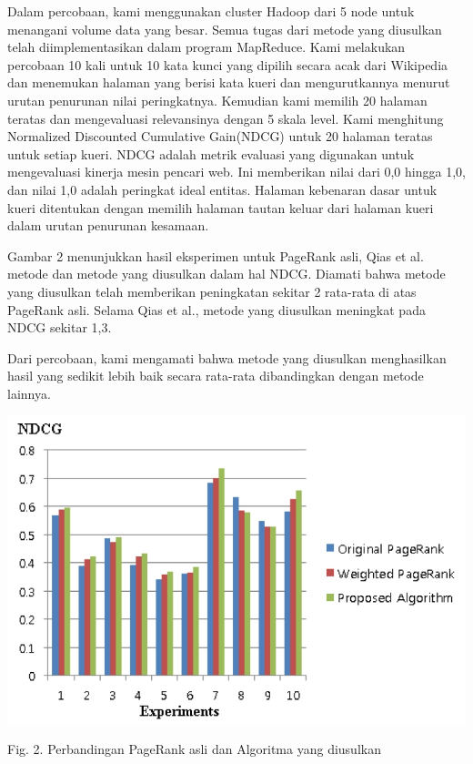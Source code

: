 \documentclass[conference]{IEEEtran}
\begin{document}
Dalam percobaan, kami menggunakan cluster Hadoop dari 5 node untuk menangani volume data yang besar. Semua tugas dari metode yang diusulkan telah diimplementasikan dalam program MapReduce.
Kami melakukan percobaan 10 kali untuk 10 kata kunci yang dipilih secara acak dari Wikipedia dan menemukan halaman yang berisi kata kueri dan mengurutkannya menurut urutan penurunan nilai peringkatnya. Kemudian kami memilih 20 halaman teratas dan mengevaluasi relevansinya dengan 5 skala level.
Kami menghitung Normalized Discounted Cumulative Gain(NDCG)\cite{resnik1999semantic} untuk 20 halaman teratas untuk setiap kueri. NDCG adalah metrik evaluasi yang digunakan untuk mengevaluasi kinerja mesin pencari web. Ini memberikan nilai dari 0,0 hingga 1,0, dan nilai 1,0 adalah peringkat ideal entitas.
Halaman kebenaran dasar untuk kueri ditentukan dengan memilih halaman tautan keluar dari halaman kueri dalam urutan penurunan kesamaan.

Gambar 2 menunjukkan hasil eksperimen untuk PageRank asli, Qias et al.\cite{qiao2010simrank} metode dan metode yang diusulkan dalam hal NDCG.
Diamati bahwa metode yang diusulkan telah memberikan peningkatan sekitar 2 rata-rata di atas PageRank asli. Selama Qias et al.\cite{qiao2010simrank}, metode yang diusulkan meningkat pada NDCG sekitar 1,3.

Dari percobaan, kami mengamati bahwa metode yang diusulkan menghasilkan hasil yang sedikit lebih baik secara rata-rata dibandingkan dengan metode lainnya.
\begin{center}
    \includegraphics[scale=0.46]{graph}

Fig. 2. Perbandingan PageRank asli dan Algoritma yang diusulkan
\end{center}
\end{document}
